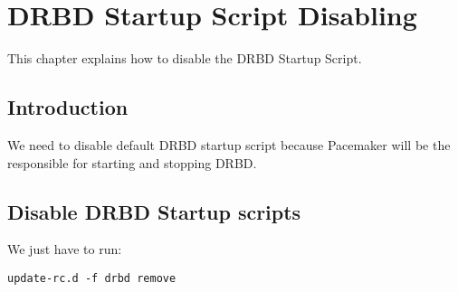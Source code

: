 

\chapter{DRBD Startup Script Disabling}
\label{chap:drbd-startup-script-disabling}
This chapter explains how to disable the DRBD Startup Script.

\section {Introduction}
We need to disable default DRBD startup script because Pacemaker will be the responsible for starting and stopping DRBD.

\section {Disable DRBD Startup scripts}
We just have to run:
\begin{verbatim}
update-rc.d -f drbd remove
\end{verbatim}

